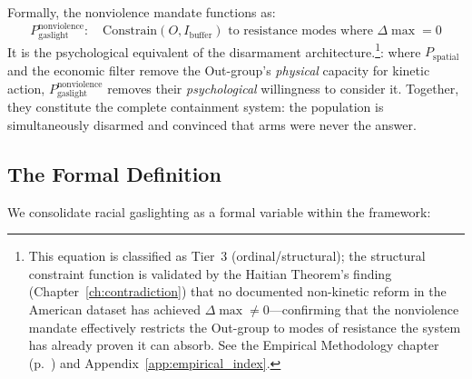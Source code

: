 Formally, the nonviolence mandate functions as:
\begin{equation}\label{eq:12.10-nonviolence-mandate-function}
P_{\text{gaslight}}^{\text{nonviolence}}: \quad \text{Constrain}(O, I_{\text{buffer}}) \text{ to resistance modes where } \Delta\max = 0
\end{equation}
It is the psychological equivalent of the disarmament architecture.\footnote{This equation is classified as Tier~3 (ordinal/structural); the structural constraint function is validated by the Haitian Theorem's finding (Chapter~\ref{ch:contradiction}) that no documented non-kinetic reform in the American dataset has achieved $\Delta\max \neq 0$---confirming that the nonviolence mandate effectively restricts the Out-group to modes of resistance the system has already proven it can absorb. See the Empirical Methodology chapter (p.~\pageref{ch:empirical_methodology}) and Appendix~\ref{app:empirical_index}.}: where $P_{\text{spatial}}$ and the economic filter remove the Out-group's \textit{physical} capacity for kinetic action, $P_{\text{gaslight}}^{\text{nonviolence}}$ removes their \textit{psychological} willingness to consider it. Together, they constitute the complete containment system: the population is simultaneously disarmed and convinced that arms were never the answer.

\subsection{The Formal Definition}

We consolidate racial gaslighting as a formal variable within the framework:

